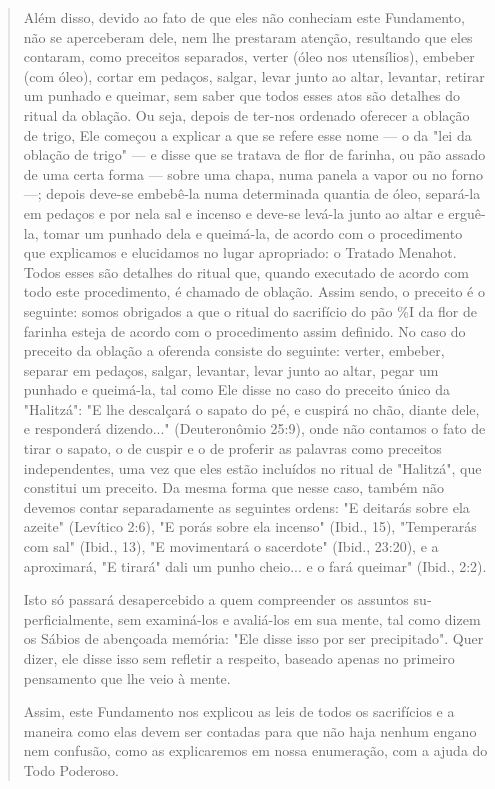 \begin{quote}
Além disso, devido ao fato de que eles não conheciam este Funda­mento,
não se aperceberam dele, nem lhe prestaram atenção, resultando que eles
contaram, como preceitos separados, verter (óleo nos utensílios),
embe­ber (com óleo), cortar em pedaços, salgar, levar junto ao altar,
levantar, retirar um punhado e queimar, sem saber que todos esses atos
são detalhes do ritual da oblação. Ou seja, depois de ter-nos ordenado
oferecer a oblação de trigo, Ele começou a explicar a que se refere esse
nome --- o da "lei da oblação de trigo" --- e disse que se tratava de
flor de farinha, ou pão assado de uma certa forma --- sobre uma chapa,
numa panela a vapor ou no forno ---; depois de­ve-se embebê-la numa
determinada quantia de óleo, separá-la em pedaços e por nela sal e
incenso e deve-se levá-la junto ao altar e erguê-la, tomar um punhado
dela e queimá-la, de acordo com o procedimento que explicamos e
elucidamos no lugar apropriado: o Tratado Menahot. Todos esses são
detalhes do ritual que, quando executado de acordo com todo este
procedimento, é chamado de obla­ção. Assim sendo, o preceito é o
seguinte: somos obrigados a que o ritual do sacrifício do pão \%I da
flor de farinha esteja de acordo com o procedimento assim definido. No
caso do preceito da oblação a oferenda consiste do seguin­te: verter,
embeber, separar em pedaços, salgar, levantar, levar junto ao altar,
pegar um punhado e queimá-la, tal como Ele disse no caso do preceito
único da "Halitzá": "E lhe descalçará o sapato do pé, e cuspirá no chão,
diante dele, e responderá dizendo..." (Deuteronômio 25:9), onde não
contamos o fato de tirar o sapato, o de cuspir e o de proferir as
palavras como preceitos indepen­dentes, uma vez que eles estão incluídos
no ritual de "Halitzá", que constitui um preceito. Da mesma forma que
nesse caso, também não devemos contar separadamente as seguintes ordens:
"E deitarás sobre ela azeite" (Levítico 2:6), "E porás sobre ela
incenso" (Ibid., 15), "Temperarás com sal" (Ibid., 13), "E
movimentará o sacerdote" (Ibid., 23:20), e a aproximará, "E tirará" dali
um pu­nho cheio... e o fará queimar" (Ibid., 2:2).

Isto só passará desapercebido a quem compreender os assuntos
su­perficialmente, sem examiná-los e avaliá-los em sua mente, tal como
dizem os Sábios de abençoada memória: "Ele disse isso por ser
precipitado". Quer di­zer, ele disse isso sem refletir a respeito,
baseado apenas no primeiro pensa­mento que lhe veio à mente.

Assim, este Fundamento nos explicou as leis de todos os sacrifícios e a
maneira como elas devem ser contadas para que não haja nenhum engano nem
confusão, como as explicaremos em nossa enumeração, com a ajuda do Todo
Poderoso.


\end{quote}
